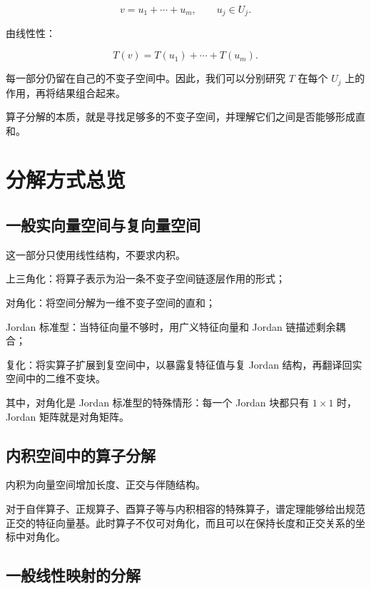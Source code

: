 \[
v=u_1+\cdots+u_m,
\qquad u_j\in U_j.
\]

由线性性：

\[
T(v)=T(u_1)+\cdots+T(u_m).
\]

每一部分仍留在自己的不变子空间中。因此，我们可以分别研究 $T$ 在每个 $U_j$ 上的作用，再将结果组合起来。

算子分解的本质，就是寻找足够多的不变子空间，并理解它们之间是否能够形成直和。

\section*{分解方式总览}


\subsection*{一般实向量空间与复向量空间}

这一部分只使用线性结构，不要求内积。

\begin{jitem}
\item %
上三角化：将算子表示为沿一条不变子空间链逐层作用的形式；
\item %
对角化：将空间分解为一维不变子空间的直和；
\item %
Jordan 标准型：当特征向量不够时，用广义特征向量和 Jordan 链描述剩余耦合；
\item %
复化：将实算子扩展到复空间中，以暴露复特征值与复 Jordan 结构，再翻译回实空间中的二维不变块。
\end{jitem}

其中，对角化是 Jordan 标准型的特殊情形：每一个 Jordan 块都只有 $1\times1$ 时，Jordan 矩阵就是对角矩阵。

\subsection*{内积空间中的算子分解}

内积为向量空间增加长度、正交与伴随结构。

对于自伴算子、正规算子、酉算子等与内积相容的特殊算子，谱定理能够给出规范正交的特征向量基。此时算子不仅可对角化，而且可以在保持长度和正交关系的坐标中对角化。

\subsection*{一般线性映射的分解}

